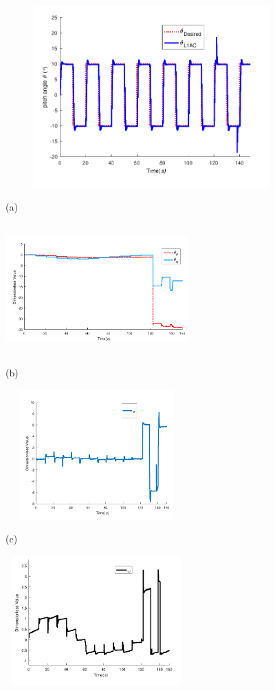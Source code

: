\begin{figure}[htp]
\centering
\begin{minipage}{0.9\linewidth}
  \centerline{\includegraphics[width=12.0cm,height = 7cm]{figure/chap5/6dof/L1AC/L1AC_x_pulse.pdf}}
  \centerline{(a) }
\end{minipage}
\vfill
\begin{minipage}{0.48\linewidth}
  \centerline{\includegraphics[width=7.0cm,height = 5cm]{figure/chap5/6dof/L1AC/Theta.pdf}}
  \centerline{(b) }
\end{minipage}
\hfill
\begin{minipage}{0.48\linewidth}
  \centerline{\includegraphics[width=7.0cm,height = 5cm]{figure/chap5/6dof/L1AC/Sigma.pdf}}
  \centerline{(c) }
\end{minipage}
\vfill
\begin{minipage}{0.48\linewidth}
  \centerline{\includegraphics[width=7.0cm,height = 5cm]{figure/chap5/6dof/L1AC/omega.pdf}}

\end{minipage}
\end{figure}

